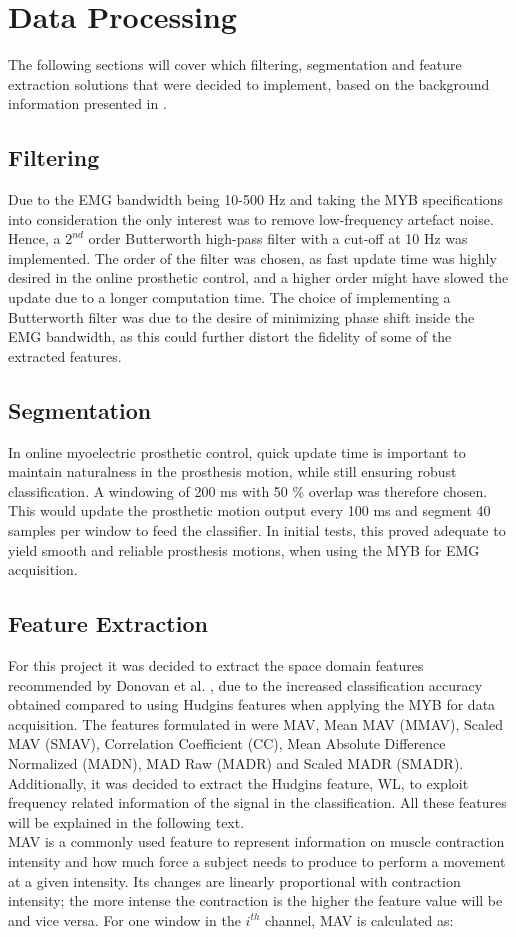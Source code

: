 \section{Data Processing}
The following sections will cover which filtering, segmentation and feature extraction solutions that were decided to implement, based on the background information presented in . 

\subsection{Filtering}
Due to the EMG bandwidth being 10-500 Hz and taking the MYB specifications into consideration the only interest was to remove low-frequency artefact noise. Hence, a $2^{nd}$ order Butterworth high-pass filter with a cut-off at 10 Hz was implemented. The order of the filter was chosen, as fast update time was highly desired in the online prosthetic control, and a higher order might have slowed the update due to a longer computation time. The choice of implementing a Butterworth filter was due to the desire of minimizing phase shift inside the EMG bandwidth, as this could further distort the fidelity of some of the extracted features. 

\subsection{Segmentation}
In online myoelectric prosthetic control, quick update time is important to maintain naturalness in the prosthesis motion, while still ensuring robust classification. A windowing of 200 ms with 50 \% overlap was therefore chosen. This would update the prosthetic motion output every 100 ms and segment 40 samples per window to feed the classifier. In initial tests, this proved adequate to yield smooth and reliable prosthesis motions, when using the MYB for EMG acquisition. 

\subsection{Feature Extraction}
For this project it was decided to extract the space domain features recommended by Donovan et al. \cite{Donovan2017}, due to the increased classification accuracy obtained compared to using Hudgins features when applying the MYB for data acquisition. The features formulated in \cite{Donovan2017} were MAV, Mean MAV (MMAV), Scaled MAV (SMAV), Correlation Coefficient (CC), Mean Absolute Difference Normalized (MADN), MAD Raw (MADR) and Scaled MADR (SMADR). Additionally, it was decided to extract the Hudgins feature, WL, to exploit frequency related information of the signal in the classification. All these features will be explained in the following text. \\
MAV is a commonly used feature to represent information on muscle contraction intensity and how much force a subject needs to produce to perform a movement at a given intensity. Its changes are linearly proportional with contraction intensity; the more intense the contraction is the higher the feature value will be and vice versa. For one window in the $i^{th}$ channel, MAV is calculated as:

